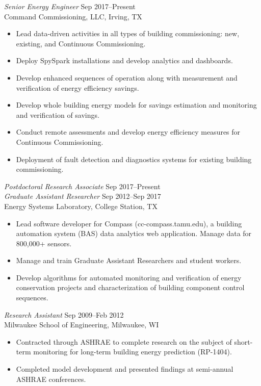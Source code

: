 \documentclass[margin]{res} %
\begin{document}
\begin{resume}
{\textit{Senior Energy Engineer} \hfill Sep 2017--Present} \\
Command Commissioning, LLC, Irving, TX

\begin{itemize}\itemsep -2pt %
\item Lead data-driven activities in all types of building commissioning: new, existing, and Continuous Commissioning\textsuperscript{\textregistered{}}.
\item Deploy SpySpark installations and develop analytics and dashboards.
\item Develop enhanced sequences of operation along with measurement and verification of energy efficiency savings.
\item Develop whole building energy models for savings estimation and monitoring and verification of savings.
\item Conduct remote assessments and develop energy efficiency measures for Continuous Commissioning\textsuperscript{\textregistered{}}.
\item Deployment of fault detection and diagnostics systems for existing building commissioning.
\end{itemize}

{\sl Postdoctoral Research Associate}  \hfill Sep 2017--Present \\
{\sl Graduate Assistant Researcher} \hfill Sep 2012--Sep 2017 \\
Energy Systems Laboratory, College Station, TX

\begin{itemize} \itemsep -2pt %
    \item Lead software developer for Compass (cc-compass.tamu.edu), a building automation system (BAS) data analytics web application. Manage data for 800,000+ sensors.
    \item Manage and train Graduate Assistant Researchers and student workers.
    \item Develop algorithms for automated monitoring and verification of energy conservation projects and characterization of building component control sequences.
\end{itemize}

\vspace{10pt}

{\sl Research Assistant} \hfill Sep 2009--Feb 2012  \\
Milwaukee School of Engineering, Milwaukee, WI
\begin{itemize}\itemsep -2pt
\item Contracted through ASHRAE to complete research on the subject of short-term monitoring for long-term building energy prediction (RP-1404).
\item Completed model development and presented findings at semi-annual ASHRAE conferences.
\end{itemize}


\end{resume}
\end{document}
